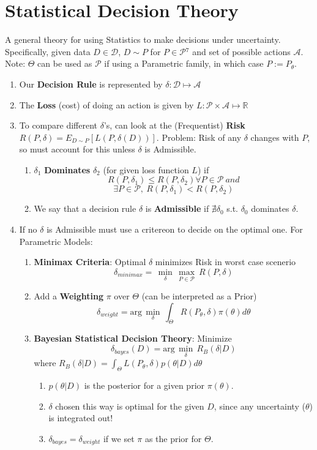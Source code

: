 \documentclass[a4paper,portrait,columns=2, hidelinks]{cheatsheet}
\begin{document}
\section{Statistical Decision Theory}

A general theory for using Statistics to make decisions under uncertainty. Specifically, given data \(D \in \mathcal{D}\), \(D \sim P\) for \(P\in \mathcal{P}\)\hyperref[sec:ft7]{$^7$} and set of possible actions \(\mathcal{A}\). Note: \(\Theta\) can be used as \(\mathcal{P}\) if using a Parametric family, in which case \(P := P_{\theta}\).
 \begin{enumerate}
 	\item Our \textbf{Decision Rule} is represented by \(\delta: \mathcal{D} \mapsto \mathcal{A}\)
 	\item The \textbf{Loss} (cost) of doing an action is given by \(L: \mathcal{P} \times \mathcal{A} \mapsto \mathbb{R}\)
 	\item To compare different \(\delta\)'s, can look at the (Frequentist) \textbf{Risk} \(R(P,\delta)=E_{D\sim P}[L(P,\delta(D))]\). Problem: Risk of any \(\delta\) changes with \(P\), so must account for this unless \(\delta\) is Admissible.
 	\begin{enumerate}
	 	\item \(\delta_1\) \textbf{Dominates} \(\delta_2\) (for given loss function \(L\)) if $$R(P,\delta_1)\leq R(P,\delta_2) \forall P \in \mathcal{P}\ and$$
	 	$$\exists P \in \mathcal{P},\ R(P,\delta_1) < R(P, \delta_2)$$
	 	\item We say that a decision rule $\delta$ is \textbf{Admissible} if $\nexists \delta_0$ s.t. $\delta_0$ dominates $\delta$. 
	\end{enumerate}
	\item If no \(\delta\) is Admissible must use a critereon to decide on the optimal one. For Parametric Models:
 	\begin{enumerate}
 		\item \textbf{Minimax Criteria}: Optimal \(\delta\) minimizes Risk in worst case scenerio 
 		$$\delta_{minimax} = \,\min\limits_{\delta}\,\max\limits_{P \in \mathcal{P}}\ R(P,\delta)$$
 		\item Add a \textbf{Weighting} \(\pi\) over $\Theta$ (can be interpreted as a Prior)
 		$$\delta_{weight}= \text{arg}\,\min\limits_{\delta}\,\int_{\Theta}^{}R(P_\theta,\delta)\pi(\theta)d\theta$$
 		\item \textbf{Bayesian Statistical Decision Theory}: Minimize
 		$$\delta_{bayes}(D)= \text{arg}\,\min\limits_{\delta}\,R_B(\delta|D)$$ where $R_B(\delta|D) = \int_{\Theta}^{}L(P_{\theta},\delta)p(\theta|D)d\theta$
 		\begin{enumerate}
 			\item $p(\theta|D)$ is the posterior for a given prior $\pi(\theta)$.
 			\item \(\delta\) chosen this way is optimal for the given \(D\), since any uncertainty (\(\theta\)) is integrated out!
 			\item \(\delta_{bayes}=\delta_{weight}\) if we set \(\pi\) as the prior for \(\Theta\).
 		\end{enumerate}
 	\end{enumerate}
\end{enumerate}
\end{document}
